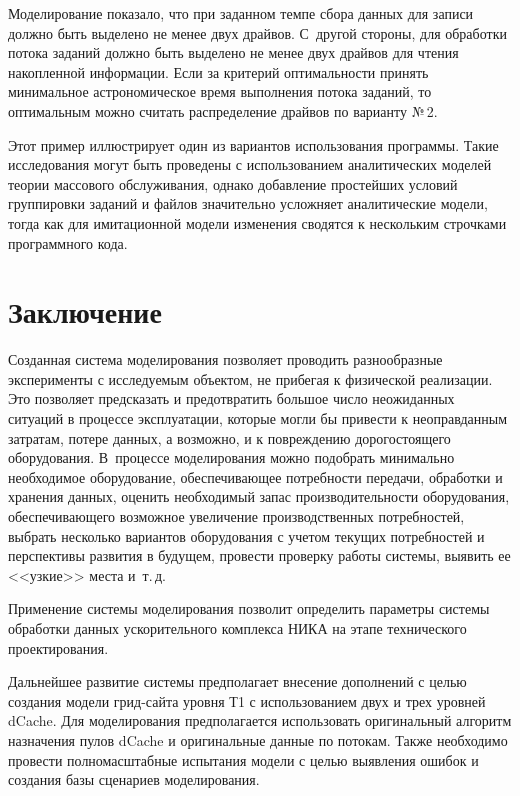 \begin{multicols}{2}
   Моделирование показало, что при заданном темпе сбора данных для записи 
должно быть выделено не менее двух драйвов. С~другой стороны, для 
обработки потока заданий должно быть выделено не менее двух драйвов для 
чтения накопленной информации. Если за критерий оп\-ти\-маль\-ности принять 
минимальное астрономическое время выполнения потока заданий, то 
оптимальным можно считать распределение драйвов по варианту №\,2.
   
   Этот пример иллюстрирует один из вариантов использования программы. 
Такие исследования могут быть проведены с использованием аналитических 
моделей теории массового обслуживания, однако добавление простейших 
условий группировки заданий и файлов значительно усложняет аналитические 
модели, тогда как для имитационной модели изменения сводятся к нескольким 
строчками программного кода. 

\section{Заключение}

   Созданная система моделирования позволяет проводить разнообразные 
эксперименты с исследуемым объектом, не прибегая к физической реализации. 
Это позволяет предсказать и предотвратить большое число неожиданных 
ситуаций в процессе эксплуатации, которые могли бы при\-вес\-ти к 
неоправданным затратам, потере данных, а возможно, и к по\-вреж\-де\-нию 
дорогостоящего обору\-до\-ва\-ния. В~процессе моделирования можно подобрать 
минимально необходимое оборудование, обеспечивающее потребности 
передачи, обработки и хранения данных, оценить необходимый запас 
производительности оборудования, обеспе\-чи\-ва\-юще\-го возможное увеличение 
производственных потребностей, выбрать несколько вариантов оборудования с 
учетом текущих потребностей и перспективы развития в будущем, провести 
проверку работы сис\-те\-мы, выявить ее <<узкие>> места и~т.\,д.
   
   Применение системы моделирования позволит определить параметры 
системы обработки данных ускорительного комплекса НИКА на этапе 
технического проектирования. 
   
   Дальнейшее развитие системы предполагает внесение дополнений с целью 
создания модели грид-сай\-та уровня Т1 с использованием двух и трех уровней 
dCache. Для моделирования предполагается использовать оригинальный 
алгоритм назначения пулов dCache и оригинальные данные по потокам. Также 
необходимо провести полномасштабные испытания модели с целью выявления 
ошибок и создания базы сценариев моделирования. 
   

\end{multicols}
